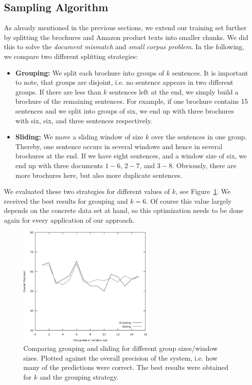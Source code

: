 \subsection{Sampling Algorithm}
As already mentioned in the previous sections, we extend our training set further by splitting the brochures and Amazon product texts into smaller chunks.
We did this to solve the \emph{document mismatch} and \emph{small corpus problem}.
In the following, we compare two different splitting strategies:
\begin{itemize}
	\item
		\textbf{Grouping:}
		We split each brochure into groups of $k$ sentences.
		It is important to note, that groups are disjoint, i.e. no sentence appears in two different groups.
		If there are less than $k$ sentences left at the end, we simply build a brochure of the remaining sentences.
		For example, if one brochure contains 15 sentences and we split into groups of six, we end up with three brochures with six, six, and three sentences respectively.
	\item
		\textbf{Sliding:}
		We move a sliding window of size $k$ over the sentences in one group.
		Thereby, one sentence occurs in several windows and hence in several brochures at the end.
		If we have eight sentences, and a window size of six, we end up with three documents $1 - 6$, $2 - 7$, and $3 - 8$.
		Obviously, there are more brochures here, but also more duplicate sentences.
\end{itemize}

We evaluated these two strategies for different values of $k$, see Figure~\ref{fig:sampling_optimization}.
We received the best results for grouping and $k = 6$.
Of course this value largely depends on the concrete data set at hand, so this optimization needs to be done again for every application of our \nto approach.

\begin{figure}
	\begin{center}
		\includegraphics[width=0.6\textwidth]{figures/sampling_optimization.eps}
	\end{center}
	\caption{Comparing grouping and sliding for different group sizes/window sizes. Plotted against the overall precision of the system, i.e. how many of the predictions were correct. The best results were obtained for $k$ and the grouping strategy.}
	\label{fig:sampling_optimization}
\end{figure}
